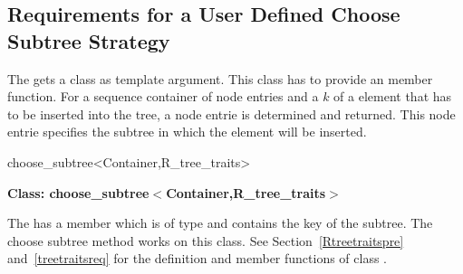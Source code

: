 \subsection{Requirements for a User Defined Choose Subtree Strategy}
\label{userchoose}
The  gets a  class as template
argument. This class has to provide an  member
function.
For a sequence container of node entries and a
 $k$ of a  element that has to be inserted
into the tree, a node entrie  is determined and returned. This
node entrie specifies the subtree in which the 
element will be inserted.

\begin{ccClassTemplate}{choose_subtree<Container,R_tree_traits>}

\noindent
{\bf Class: choose\_subtree$<$Container,R\_tree\_traits$>$}

\ccDefinition
The  has a member
 which is of
type  and contains the key of the subtree.
The choose subtree method works
on this class. 
See Section~\ref{Rtreetraitspre} and~\ref{treetraitsreq} for the definition and member
functions of class .


\ccCreation
{}

\ccOperations
{}

\end{ccClassTemplate}
